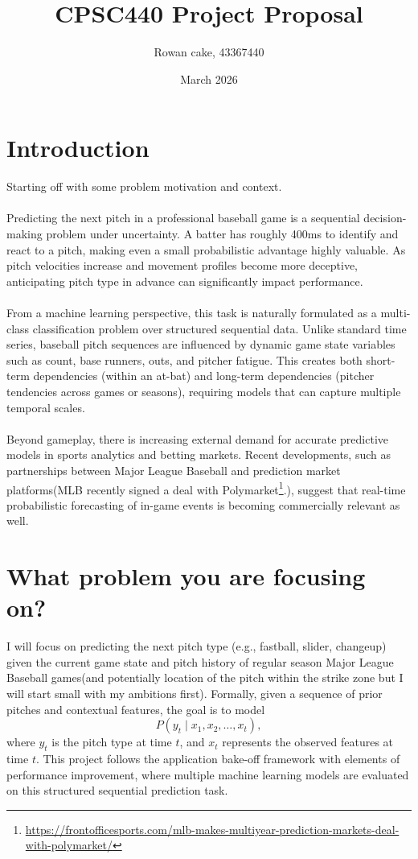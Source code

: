 \documentclass{article}
\title{CPSC440 Project Proposal}
\author{Rowan cake, 43367440}
\date{March 2026}
\begin{document}
\maketitle

\section{Introduction}
Starting off with some problem motivation and context. \\ \\

Predicting the next pitch in a professional baseball game is a sequential decision-making problem under uncertainty. A batter has roughly 400ms to identify and react to a pitch, making even a small probabilistic advantage highly valuable. As pitch velocities increase and movement profiles become more deceptive, anticipating pitch type in advance can significantly impact performance. \\ \\
From a machine learning perspective, this task is naturally formulated as a multi-class classification problem over structured sequential data. Unlike standard time series, baseball pitch sequences are influenced by dynamic game state variables such as count, base runners, outs, and pitcher fatigue. This creates both short-term dependencies (within an at-bat) and long-term dependencies (pitcher tendencies across games or seasons), requiring models that can capture multiple temporal scales. \\ \\
Beyond gameplay, there is increasing external demand for accurate predictive models in sports analytics and betting markets. Recent developments, such as partnerships between Major League Baseball and prediction market platforms(MLB recently signed a deal with Polymarket\footnote{\url{https://frontofficesports.com/mlb-makes-multiyear-prediction-markets-deal-with-polymarket/}}.), suggest that real-time probabilistic forecasting of in-game events is becoming commercially relevant as well.

\section{What problem you are focusing on?}
I will focus on predicting the next pitch type (e.g., fastball, slider, changeup) given the current game state and pitch history of regular season Major League Baseball games(and potentially location of the pitch within the strike zone but I will start small with my ambitions first).
Formally, given a sequence of prior pitches and contextual features, the goal is to model
\[
P(y_t \mid x_1, x_2, \dots, x_t),
\]
where \(y_t\) is the pitch type at time \(t\), and \(x_t\) represents the observed features at time \(t\). This project follows the application bake-off framework with elements of performance improvement, where multiple machine learning models are evaluated on this structured sequential prediction task.
\clearpage
\end{document}
